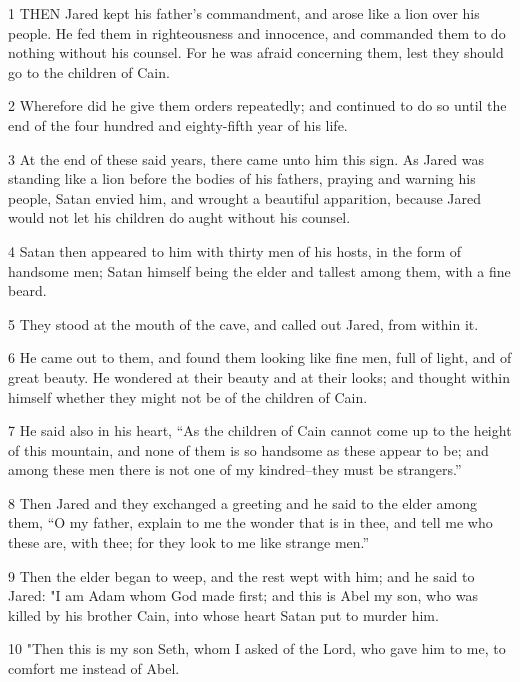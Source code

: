 \par 1 THEN Jared kept his father's commandment, and arose like a lion over his people. He fed them in righteousness and innocence, and commanded them to do nothing without his counsel. For he was afraid concerning them, lest they should go to the children of Cain.

\par 2 Wherefore did he give them orders repeatedly; and continued to do so until the end of the four hundred and eighty-fifth year of his life.

\par 3 At the end of these said years, there came unto him this sign. As Jared was standing like a lion before the bodies of his fathers, praying and warning his people, Satan envied him, and wrought a beautiful apparition, because Jared would not let his children do aught without his counsel.

\par 4 Satan then appeared to him with thirty men of his hosts, in the form of handsome men; Satan himself being the elder and tallest among them, with a fine beard.

\par 5 They stood at the mouth of the cave, and called out Jared, from within it.

\par 6 He came out to them, and found them looking like fine men, full of light, and of great beauty. He wondered at their beauty and at their looks; and thought within himself whether they might not be of the children of Cain.

\par 7 He said also in his heart, “As the children of Cain cannot come up to the height of this mountain, and none of them is so handsome as these appear to be; and among these men there is not one of my kindred--they must be strangers.”

\par 8 Then Jared and they exchanged a greeting and he said to the elder among them, “O my father, explain to me the wonder that is in thee, and tell me who these are, with thee; for they look to me like strange men.”

\par 9 Then the elder began to weep, and the rest wept with him; and he said to Jared: "I am Adam whom God made first; and this is Abel my son, who was killed by his brother Cain, into whose heart Satan put to murder him.

\par 10 "Then this is my son Seth, whom I asked of the Lord, who gave him to me, to comfort me instead of Abel.

